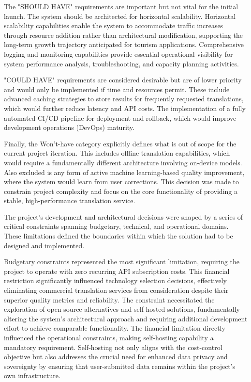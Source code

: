 The "SHOULD HAVE" requirements are important but not vital for the initial launch. The system should be architected for horizontal scalability. Horizontal scalability capabilities enable the system to accommodate traffic increases through resource addition rather than architectural modification, supporting the long-term growth trajectory anticipated for tourism applications\cite{cloudzero_horizontal_scaling}\cite{sentinelone_horizontal_scalability}. Comprehensive logging and monitoring capabilities provide essential operational visibility for system performance analysis, troubleshooting, and capacity planning activities\cite{bryant2020observability}\cite{sematext_logging_best_practices}. 

"COULD HAVE" requirements are considered desirable but are of lower priority and would only be implemented if time and resources permit. These include advanced caching strategies to store results for frequently requested translations, which would further reduce latency and API costs\cite{microsoft2022caching}\cite{tekula2024amazon}\cite{apyflux2024optimising}. The implementation of a fully automated CI/CD pipeline for deployment and rollback, which would improve development operations (DevOps) maturity\cite{zymr_devops_maturity}\cite{redhat2024cicd}\cite{testevolve2025cicd}.

Finally, the Won't-have category explicitly defines what is out of scope for the current project iteration. This includes offline translation capabilities, which would require a fundamentally different architecture involving on-device models. Also excluded is any form of active machine learning-based quality improvement, where the system would learn from user corrections. This decision was made to constrain project complexity and focus on the core functionality of providing a stable, high-performance translation service\cite{on_device_language_models}\cite{real_time_vs_offline_translation}\cite{postediting}.

The project's development and architectural decisions were shaped by a series of critical constraints spanning budgetary, technical, and operational domains. These limitations defined the boundaries within which the solution had to be designed and implemented.

Budgetary constraints represented the most significant limitation, requiring the project to operate with zero recurring API subscription costs. This financial restriction significantly influenced technology selection decisions, effectively eliminating commercial translation services from consideration despite their superior quality metrics and reliability. The constraint necessitated the exploration of open-source alternatives and self-hosted solutions, fundamentally altering the system's architectural approach and requiring additional development effort to achieve comparable functionality. The financial limitation directly influenced the operational constraints, making self-hosting capability a mandatory requirement. Self-hosting not only aligns with the cost-control objective but also addresses the crucial need for enhanced data privacy and sovereignty by ensuring that user-submitted data remains within the project's own infrastructure.

